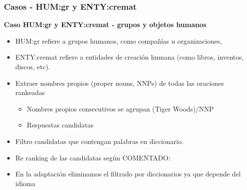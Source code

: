 \begin{frame}
\frametitle{Casos - HUM:gr y ENTY:cremat}
\textbf{Caso HUM:gr y ENTY:cremat - grupos y objetos humanos} \newline
  \begin{itemize}
    \item HUM:gr refiere a grupos humanos, como compañías u organizaciones, 
    \item ENTY:cremat refiere a entidades de creación humana (como libros, inventos, discos, etc).
    \item Extraer nombres propios (proper nouns, NNPs) de todas las oraciones rankeadas 
    \begin{itemize}
        \item Nombres propios consecutivos se agrupan (Tiger Woods)/NNP 
        \item Respuestas candidatas
    \end{itemize}
    \item Filtro candidatas que contengan palabras en diccionario. \footnotemark
    \item Re ranking de las candidatas según {\color{red}COMENTADO}: 
    \item En la adaptación eliminamos el filtrado por diccionarios ya que depende del idioma
  \end{itemize}

\end{frame}

